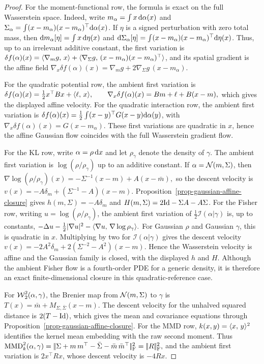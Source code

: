 \begin{proof}
For the moment-functional row, the formula is exact on the full Wasserstein space. Indeed, write $m_\alpha=\int x\,\mathrm{d}\alpha(x)$ and $\Sigma_\alpha=\int (x-m_\alpha)(x-m_\alpha)^\top\mathrm{d}\alpha(x)$. If \(\eta\) is a signed perturbation with zero total mass, then $\mathrm{d} m_\alpha[\eta]=\int x\,\mathrm{d}\eta(x)$ and $\mathrm{d}\Sigma_\alpha[\eta]=\int (x-m_\alpha)(x-m_\alpha)^\top\mathrm{d}\eta(x)$. Thus, up to an irrelevant additive constant, the first variation is $\delta f(\alpha)(x)=\langle \nabla_m g,\,x\rangle+\langle \nabla_\Sigma g,\,(x-m_\alpha)(x-m_\alpha)^\top\rangle$,
and its spatial gradient is the affine field
\(\nabla_x\delta f(\alpha)(x) = \nabla_m g+2\nabla_\Sigma g\,(x-m_\alpha).\)

For the quadratic potential row, the ambient first variation is \(\delta f(\alpha)(x)=\frac12x^\top Bx+\langle \ell,\,x\rangle, \qquad \nabla_x\delta f(\alpha)(x)=B m+\ell+B(x-m),\)
which gives the displayed affine velocity. For the quadratic interaction row, the ambient first variation is $\delta f(\alpha)(x)=\frac12\int (x-y)^\top G(x-y)\mathrm{d}\alpha(y)$, with $\nabla_x\delta f(\alpha)(x)=G(x-m_\alpha)$.
These first variations are quadratic in \(x\), hence the affine Gaussian flow coincides with the full Wasserstein gradient flow.

For the KL row, write $\alpha=\rho\,\mathrm{d} x$ and let $\rho_\gamma$ denote the density of $\gamma$. The ambient first variation is \(\log(\rho/\rho_\gamma)\) up to an additive constant. If \(\alpha=\mathcal{N}(m,\Sigma)\), then
\(\nabla\log(\rho/\rho_\gamma)(x) = -\Sigma^{-1}(x-m)+A(x-\bar m),\)
so the descent velocity is
\(v(x)=-A\delta_m+(\Sigma^{-1}-A)(x-m)\).
Proposition~\ref{prop-gaussian-affine-closure} gives \(h(m,\Sigma)=-A\delta_m\) and \(H(m,\Sigma)=2\mathrm{Id}-\Sigma A-A\Sigma\). For the Fisher row, writing \(u=\log(\rho/\rho_\gamma)\), the ambient first variation of \(\frac12\mathcal I(\alpha|\gamma)\) is, up to constants,
\(-\Delta u-\frac12|\nabla u|^2-\langle \nabla u,\,\nabla\log\rho_\gamma\rangle.\)
For Gaussian \(\rho\) and Gaussian \(\gamma\), this is quadratic in \(x\). Multiplying by two for \(\mathcal I(\alpha|\gamma)\) gives the descent velocity
\(v(x)=-2A^2\delta_m+2(\Sigma^{-2}-A^2)(x-m).\)
Hence the Wasserstein velocity is affine and the Gaussian family is closed, with the displayed \(h\) and \(H\). Although the ambient Fisher flow is a fourth-order PDE for a generic density, it is therefore an exact finite-dimensional closure in this quadratic-reference case.

For \(\operatorname{\mathcal{W}}_2^2(\alpha,\gamma)\), the Brenier map from \(\mathcal{N}(m,\Sigma)\) to \(\gamma\) is
\(T(x)=\bar m+M_{\Sigma,\bar\Sigma}(x-m)\).
The descent velocity for the unhalved squared distance is \(2(T-\mathrm{Id})\), which gives the mean and covariance equations through Proposition~\ref{prop-gaussian-affine-closure}. For the MMD row, \(k(x,y)=\langle x,\,y\rangle^2\) identifies the kernel mean embedding with the raw second moment. Thus
\(\operatorname{MMD}_k^2(\alpha,\gamma) = |\!| \Sigma+m\,m^\top-\bar\Sigma-\bar m\,\bar m^\top |\!|_{\mathrm F}^2 = |\!| R |\!|_{\mathrm F}^2,\)
and the ambient first variation is \(2x^\top R x\), whose descent velocity is \(-4Rx\).


\end{proof}

